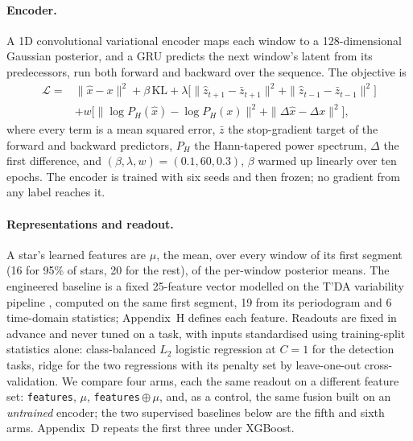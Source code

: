\documentclass{article}
\begin{document}
\paragraph{Encoder.} A 1D convolutional variational encoder \citep{kingma2014} maps each window to a
128-dimensional Gaussian posterior, and a GRU \citep{cho2014} predicts the next window's latent from
its predecessors, run both forward and backward over the sequence. The objective is
\begin{align*}
\mathcal{L} = {} & \|\hat{x}-x\|^{2} + \beta\,\mathrm{KL}
+ \lambda\big[\|\hat{z}_{t+1}-\bar{z}_{t+1}\|^{2} + \|\hat{z}_{t-1}-\bar{z}_{t-1}\|^{2}\big] \\
& + w\big[\|\log P_{H}(\hat{x})-\log P_{H}(x)\|^{2} + \|\Delta\hat{x}-\Delta x\|^{2}\big],
\end{align*}
where every term is a mean squared error, $\bar{z}$ the stop-gradient target of the forward and
backward predictors, $P_{H}$ the Hann-tapered power spectrum, $\Delta$ the first difference, and
$(\beta,\lambda,w) = (0.1, 60, 0.3)$, $\beta$ warmed up linearly over ten epochs. The encoder is trained with six seeds and then frozen; no gradient from any label reaches
it.

\paragraph{Representations and readout.} A star's learned features are $\mu$, the mean, over every
window of its first segment (16 for 95\% of stars, 20 for the rest), of the per-window posterior
means. The engineered baseline is a fixed 25-feature vector modelled on the T'DA variability pipeline
\citep{audenaert2021}, computed on the same first segment, 19 from its periodogram and 6 time-domain statistics; Appendix~H defines each feature. Readouts are fixed in advance and never
tuned on a task, with inputs standardised using training-split statistics alone: class-balanced $L_{2}$ logistic regression
at $C = 1$ for the detection tasks, ridge for the two regressions with its penalty set by leave-one-out
cross-validation. We compare four
arms, each the same readout on a different feature set: \texttt{features}, $\mu$,
\texttt{features}\,$\oplus\,\mu$, and, as a control, the same fusion built on an \emph{untrained}
encoder; the two supervised baselines below are the fifth and sixth arms.
Appendix~D repeats the first three under XGBoost.
\end{document}
